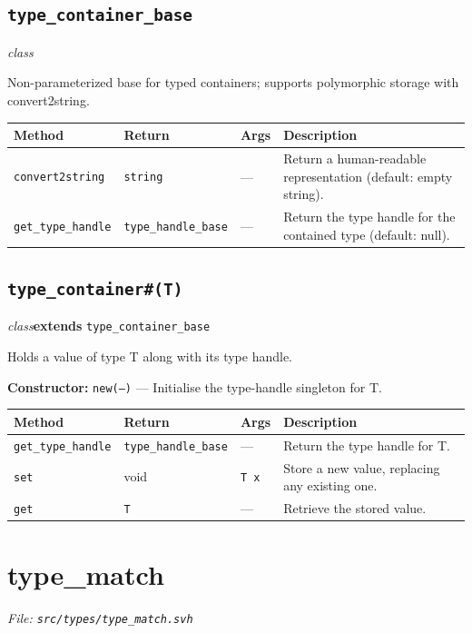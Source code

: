 \documentclass[11pt,letterpaper]{report}
\begin{document}
\subsection*{\texttt{type\_container\_base}}
\noindent\small\textit{class}\par

Non-parameterized base for typed containers; supports polymorphic storage with convert2string.

\begin{xltabular}{\linewidth}{>{\small}p{1.35in} >{\small}p{1.25in} >{\small}p{0.95in} >{\small}X}
\toprule
\textbf{Method} & \textbf{Return} & \textbf{Args} & \textbf{Description} \\
\midrule
\endhead
\bottomrule
\endfoot
\texttt{convert2string} & \texttt{string} & --- & Return a human-readable representation (default: empty string). \\
\texttt{get\_type\_handle} & \texttt{type\_handle\_base} & --- & Return the type handle for the contained type (default: null). \\
\end{xltabular}

\subsection*{\texttt{type\_container\#(T)}}
\noindent\small\textit{class}\quad \textbf{extends} \texttt{type\_container\_base}\par

Holds a value of type T along with its type handle.

\noindent\textbf{Constructor:} \texttt{new(---)} --- Initialise the type-handle singleton for T.

\begin{xltabular}{\linewidth}{>{\small}p{1.35in} >{\small}p{1.25in} >{\small}p{0.95in} >{\small}X}
\toprule
\textbf{Method} & \textbf{Return} & \textbf{Args} & \textbf{Description} \\
\midrule
\endhead
\bottomrule
\endfoot
\texttt{get\_type\_handle} & \texttt{type\_handle\_base} & --- & Return the type handle for T. \\
\texttt{set} & void & \texttt{T x} & Store a new value, replacing any existing one. \\
\texttt{get} & \texttt{T} & --- & Retrieve the stored value. \\
\end{xltabular}

\section{type\_match}
\noindent\small\textit{File: \texttt{src/types/type\_match.svh}}\par
\end{document}
